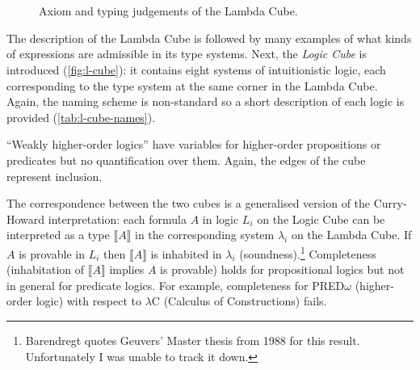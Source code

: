 \documentclass[12pt,toc=bibliography,numbers=noendperiod,
               footnotes=multiple,twoside]{scrartcl}
\begin{document}
\begin{figure}
    \\
    \vspace{10pt}
    \begin{minipage}[b]{.5\linewidth}
        \begin{prooftree}
        \end{prooftree}
    \end{minipage}
    \\
    \vspace{10pt}
    \begin{minipage}[b]{.5\linewidth}
        \begin{prooftree}
        \end{prooftree}
    \end{minipage}
    \caption{Axiom and typing judgements of the Lambda Cube.}
    \label{fig:lambda-cube-typing}
\end{figure}


The description of the Lambda Cube is followed by many examples of what kinds of expressions are admissible in its type systems. Next, the \emph{Logic Cube} is introduced (\cref{fig:l-cube}): it contains eight systems of intuitionistic logic, each corresponding to the type system at the same corner in the Lambda Cube. Again, the naming scheme is non-standard so a short description of each logic is provided (\cref{tab:l-cube-names}).

\enquote{Weakly higher-order logics} have variables for higher-order propositions or predicates but no quantification over them. Again, the edges of the cube represent inclusion.

The correspondence between the two cubes is a generalised version of the Curry-Howard interpretation: each formula \(A\) in logic \(L_i\) on the Logic Cube can be interpreted as a type \(\llbracket A \rrbracket\) in the corresponding system \(\lambda_i\) on the Lambda Cube. If \(A\) is provable in \(L_i\) then \(\llbracket A \rrbracket\) is inhabited in \(\lambda_i\) (soundness).\footnote{Barendregt quotes Geuvers' Master thesis from 1988 for this result. Unfortunately I was unable to track it down.} Completeness (inhabitation of \(\llbracket A \rrbracket\) implies \(A\) is provable) holds for propositional logics but not in general for predicate logics. For example, completeness for PRED\(\omega\) (higher-order logic) with respect to \(\lambda\)C (Calculus of Constructions) fails.
\end{document}
